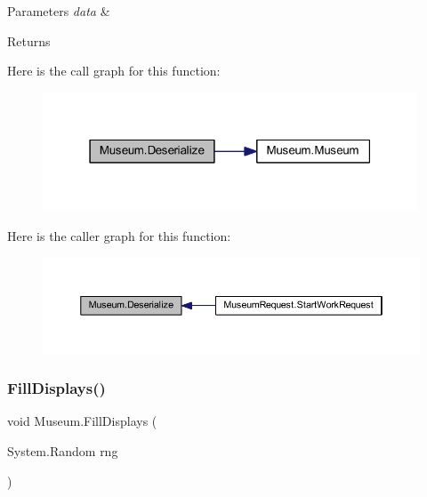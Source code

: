 \begin{DoxyParams}{Parameters}
{\em data} & \\
\hline
\end{DoxyParams}
\begin{DoxyReturn}{Returns}

\end{DoxyReturn}
Here is the call graph for this function\+:\nopagebreak
\begin{figure}[H]
\begin{center}
\leavevmode
\includegraphics[width=316pt]{class_museum_a1b4fb627a19112e3ba3d25e8108de2c3_cgraph}
\end{center}
\end{figure}
Here is the caller graph for this function\+:
\nopagebreak
\begin{figure}[H]
\begin{center}
\leavevmode
\includegraphics[width=350pt]{class_museum_a1b4fb627a19112e3ba3d25e8108de2c3_icgraph}
\end{center}
\end{figure}
\mbox{\label{class_museum_ae07741bc8fd7f97c84fed0050e18c3c4}} 
\subsubsection{\texorpdfstring{Fill\+Displays()}{FillDisplays()}}
{\footnotesize\ttfamily void Museum.\+Fill\+Displays (\begin{DoxyParamCaption}\item[{System.\+Random}]{rng }\end{DoxyParamCaption})\hspace{0.3cm}{\ttfamily [private]}}



